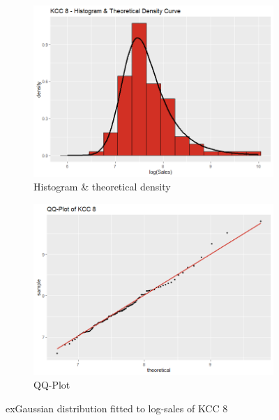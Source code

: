  \begin{figure}[H]
\centering
\begin{subfigure}{.45\textwidth}
  \centering
  \includegraphics[width=\linewidth]{figures/kcc_8_density.png}
  \caption{Histogram \& theoretical density}
  \label{fig:kcc_8_density}
\end{subfigure}
\begin{subfigure}{.45\textwidth}
  \centering
  \includegraphics[width=\linewidth]{figures/kcc_8_qqplot.png}
  \caption{QQ-Plot}
  \label{fig:kcc_8_qqplot}
\end{subfigure}
\caption{exGaussian distribution fitted to log-sales of \ac{KCC} 8}
\label{fig:kcc_8_marginal}
\end{figure} 


